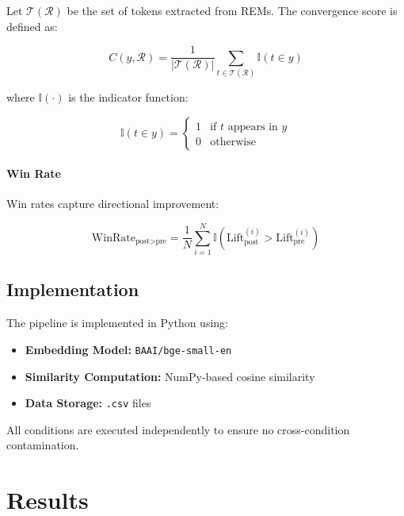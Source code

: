 \documentclass[11pt]{article}
\begin{document}
Let $\mathcal{T}(\mathcal{R})$ be the set of tokens extracted from REMs. The convergence score is defined as:

\begin{equation}
C(y, \mathcal{R}) = \frac{1}{|\mathcal{T}(\mathcal{R})|} \sum_{t \in \mathcal{T}(\mathcal{R})} \mathbb{I}(t \in y)
\end{equation}

where $\mathbb{I}(\cdot)$ is the indicator function:

\begin{equation}
\mathbb{I}(t \in y) =
\begin{cases}
1 & \text{if } t \text{ appears in } y \\
0 & \text{otherwise}
\end{cases}
\end{equation}

\paragraph{Win Rate}

Win rates capture directional improvement:

\begin{equation}
\text{WinRate}_{\text{post} > \text{pre}} =
\frac{1}{N} \sum_{i=1}^{N} \mathbb{I}\left( \text{Lift}_{\text{post}}^{(i)} > \text{Lift}_{\text{pre}}^{(i)} \right)
\end{equation}

\subsection{Implementation}

The pipeline is implemented in Python using:

\begin{itemize}
\item \textbf{Embedding Model:} \texttt{BAAI/bge-small-en}
\item \textbf{Similarity Computation:} NumPy-based cosine similarity
\item \textbf{Data Storage:} \texttt{.csv} files
\end{itemize}

All conditions are executed independently to ensure no cross-condition contamination.

\section{Results}
\end{document}
